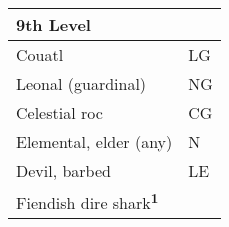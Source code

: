 \begin{longtable}{llll}
{\begin{minipage}[t]{3.326in}
\textbf{9th Level}\end{minipage}} & \multicolumn{3}{p{0.601in}|}{\begin{minipage}[t]{0.601in}\raggedright
\end{minipage}}\\
\hline
\multicolumn{1}{|p{3.326in}|}{\begin{minipage}[t]{3.326in}\raggedright
Couatl\end{minipage}} & \multicolumn{3}{p{0.601in}|}{\begin{minipage}[t]{0.601in}\raggedright
LG\end{minipage}}\\
\hline
\multicolumn{1}{|p{3.326in}|}{\begin{minipage}[t]{3.326in}\raggedright
Leonal (guardinal)\end{minipage}} & \multicolumn{3}{p{0.601in}|}{\begin{minipage}[t]{0.601in}\raggedright
NG\end{minipage}}\\
\hline
\multicolumn{1}{|p{3.326in}|}{\begin{minipage}[t]{3.326in}\raggedright
Celestial roc\end{minipage}} & \multicolumn{3}{p{0.601in}|}{\begin{minipage}[t]{0.601in}\raggedright
CG\end{minipage}}\\
\hline
\multicolumn{1}{|p{3.326in}|}{\begin{minipage}[t]{3.326in}\raggedright
Elemental, elder (any)\end{minipage}} & \multicolumn{3}{p{0.601in}|}{\begin{minipage}[t]{0.601in}\raggedright
N\end{minipage}}\\
\hline
\multicolumn{1}{|p{3.326in}|}{\begin{minipage}[t]{3.326in}\raggedright
Devil, barbed\end{minipage}} & \multicolumn{3}{p{0.601in}|}{\begin{minipage}[t]{0.601in}\raggedright
LE\end{minipage}}\\
\hline
\multicolumn{1}{|p{3.326in}|}{\begin{minipage}[t]{3.326in}\raggedright
Fiendish dire shark\textsuperscript{\textbf{1}}\end{minipage}} & \multicolumn{3}{p{0.601in}|}{\begin{minipage}[t]{0.601in}\raggedright

\end{minipage}}
\end{longtable}
